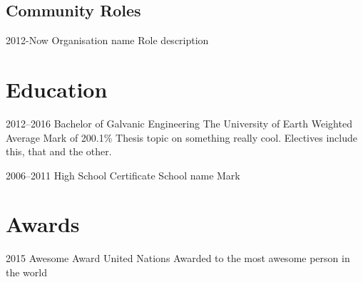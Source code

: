 \documentclass[]{friggeri-cv} %
\begin{document}


\subsection{Community Roles}

\begin{entrylist}


\entry
{2012-Now}
{Organisation name} 
{}
{Role}
{
description
}




\end{entrylist}


\section{Education}

\begin{entrylist} 


\entry
{2012--2016}
{Bachelor {\normalfont of Galvanic Engineering}}
{The University of Earth}
{Weighted Average Mark of 200.1\%}
{
Thesis topic on something really cool. Electives include this, that and the other.
}


\entry
{2006--2011}  
{High School Certificate}
{School name}
{Mark} 
{
}


\end{entrylist}


\section{Awards}

\begin{entrylist}


\entry
{2015}
{Awesome Award}
{United Nations} 
{} 
{Awarded to the most awesome person in the world}



\end{entrylist}
\end{document}
